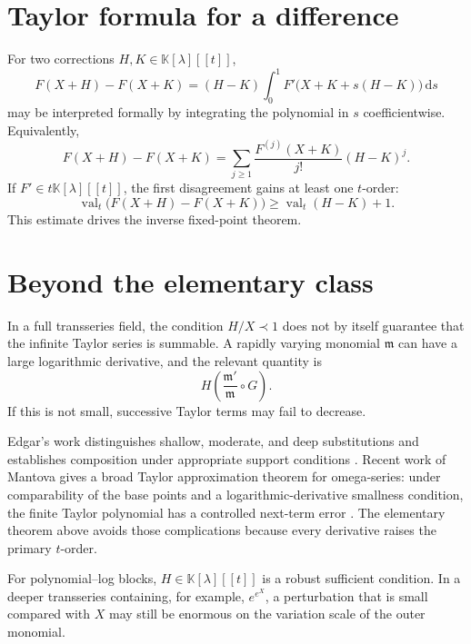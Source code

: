 \documentclass[11pt,openany]{book}
\theoremstyle{definition}
\theoremstyle{plain}
\theoremstyle{remark}
\newcommand{\K}{\mathbb{K}}
\newcommand{\m}{\mathfrak{m}}
\newcommand{\dd}{\,\mathrm{d}}
\newcommand{\precdom}{\prec}
\DeclareMathOperator{\val}{val}
\begin{document}
\section{Taylor formula for a difference}
For two corrections \(H,K\in\K[\lambda][[t]]\),
\begin{equation}\label{eq:taylor-difference}
 F(X+H)-F(X+K)
 =(H-K)\int_0^1F'\bigl(X+K+s(H-K)\bigr)\dd s
\end{equation}
may be interpreted formally by integrating the polynomial in \(s\) coefficientwise. Equivalently,
\begin{equation}\label{eq:taylor-difference-series}
 F(X+H)-F(X+K)
 =\sum_{j\ge1}\frac{F^{(j)}(X+K)}{j!}(H-K)^j.
\end{equation}
If \(F'\in t\K[\lambda][[t]]\), the first disagreement gains at least one \(t\)-order:
\begin{equation}\label{eq:composition-Lipschitz}
 \val_t\bigl(F(X+H)-F(X+K)\bigr)
 \ge\val_t(H-K)+1.
\end{equation}
This estimate drives the inverse fixed-point theorem.

\section{Beyond the elementary class}
In a full transseries field, the condition \(H/X\precdom1\) does not by itself guarantee that the infinite Taylor series is summable. A rapidly varying monomial \(\m\) can have a large logarithmic derivative, and the relevant quantity is
\begin{equation}\label{eq:variation-scale}
 H\left(\frac{\m'}{\m}\circ G\right).
\end{equation}
If this is not small, successive Taylor terms may fail to decrease.

Edgar's work distinguishes shallow, moderate, and deep substitutions and establishes composition under appropriate support conditions \cite{edgar-composition,edgar-fractional}. Recent work of Mantova gives a broad Taylor approximation theorem for omega-series: under comparability of the base points and a logarithmic-derivative smallness condition, the finite Taylor polynomial has a controlled next-term error \cite{mantova-monotonicity}. The elementary theorem above avoids those complications because every derivative raises the primary \(t\)-order.

\begin{warningbox}
For polynomial--log blocks, \(H\in\K[\lambda][[t]]\) is a robust sufficient condition. In a deeper transseries containing, for example, \(e^{e^X}\), a perturbation that is small compared with \(X\) may still be enormous on the variation scale of the outer monomial.
\end{warningbox}
\end{document}
